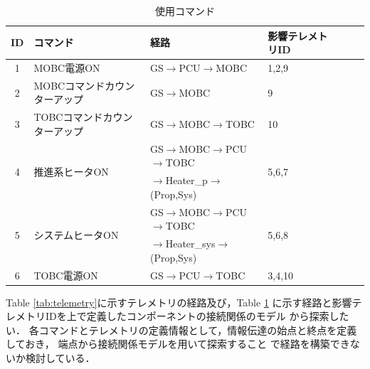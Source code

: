 \documentclass[11pt]{article}
\begin{document}
\begin{table}[H]
   \centering
   \caption{使用コマンド}
   \label{tab:command}
      \begin{tabular}{clllccc} \hline
         ID&コマンド&経路&影響テレメトリID\\ \hline
         1&MOBC電源ON&GS$\rightarrow$PCU$\rightarrow$MOBC&1,2,9\\
         2&MOBCコマンドカウンターアップ&GS$\rightarrow$MOBC&9\\
         3&TOBCコマンドカウンターアップ&GS$\rightarrow$MOBC$\rightarrow$TOBC&10\\
         \multirow{2}{*}{4}&\multirow{2}{*}{推進系ヒータON}&GS$\rightarrow$MOBC$\rightarrow$PCU$\rightarrow$TOBC&\multirow{2}{*}{5,6,7}\\
         &&$\rightarrow$Heater\_p$\rightarrow$(Prop,Sys)&\\
         \multirow{2}{*}{5}&\multirow{2}{*}{システムヒータON}&GS$\rightarrow$MOBC$\rightarrow$PCU$\rightarrow$TOBC&\multirow{2}{*}{5,6,8}\\
         &&$\rightarrow$Heater\_sys$\rightarrow$(Prop,Sys)&\\
         6&TOBC電源ON&GS$\rightarrow$PCU$\rightarrow$TOBC&3,4,10\\ \hline
      \end{tabular}
\end{table}

Table \ref{tab:telemetry}に示すテレメトリの経路及び，Table \ref{tab:command}
に示す経路と影響テレメトリIDを上で定義したコンポーネントの接続関係のモデル
から探索したい．
各コマンドとテレメトリの定義情報として，情報伝達の始点と終点を定義しておき，
端点から接続関係モデルを用いて探索すること
で経路を構築できないか検討している．%

\end{document}
